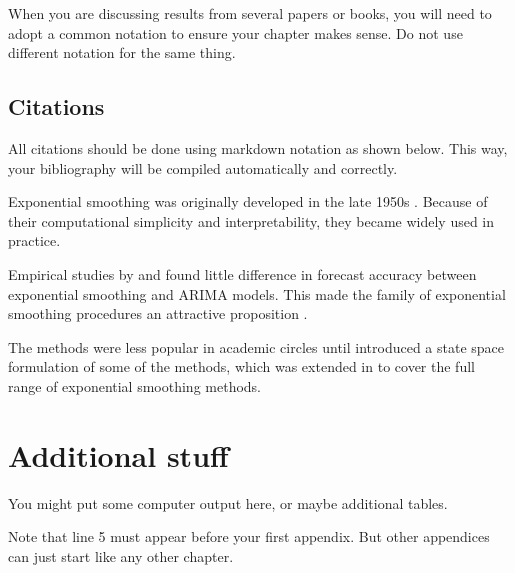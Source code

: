 \documentclass{monashthesis}
\begin{document}
When you are discussing results from several papers or books, you will
need to adopt a common notation to ensure your chapter makes sense. Do
not use different notation for the same thing.

\section{Citations}\label{citations}

All citations should be done using markdown notation as shown below.
This way, your bibliography will be compiled automatically and
correctly.

Exponential smoothing was originally developed in the late 1950s
\autocites{Brown59}{Brown63}{Holt57}{Winters60}. Because of their
computational simplicity and interpretability, they became widely used
in practice.

Empirical studies by \textcite{MH79} and \textcite{Metal82} found little
difference in forecast accuracy between exponential smoothing and ARIMA
models. This made the family of exponential smoothing procedures an
attractive proposition \autocite[see][]{CKOS01}.

The methods were less popular in academic circles until \textcite{OKS97}
introduced a state space formulation of some of the methods, which was
extended in \textcite{HKSG02} to cover the full range of exponential
smoothing methods.

\appendix

\chapter{Additional stuff}\label{additional-stuff}

You might put some computer output here, or maybe additional tables.

Note that line 5 must appear before your first appendix. But other
appendices can just start like any other chapter.

\printbibliography[heading=bibintoc]
\end{document}
